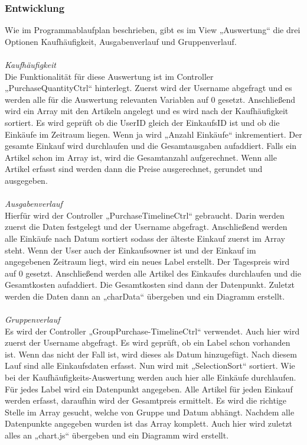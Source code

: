 \documentclass[12pt,a4paper]{article}
\begin{document}
\subsubsection*{Entwicklung}
Wie im Programmablaufplan beschrieben, gibt es im View „Auswertung“ die drei Optionen Kaufhäufigkeit, Ausgabenverlauf und Gruppenverlauf. 
\\
\\
\textit{Kaufhäufigkeit}
\\
Die Funktionalität für diese Auswertung ist im Controller „PurchaseQuantityCtrl“ hinterlegt. Zuerst wird der Username abgefragt und es werden alle für die Auswertung relevanten Variablen auf 0 gesetzt. Anschließend wird ein Array mit den Artikeln angelegt und es wird nach der Kaufhäufigkeit sortiert. Es wird geprüft ob die UserID gleich der EinkaufsID ist und ob die Einkäufe im Zeitraum liegen. Wenn ja wird „Anzahl Einkäufe“ inkrementiert. Der gesamte Einkauf wird durchlaufen und die Gesamtausgaben aufaddiert. Falls ein Artikel schon im Array ist, wird die Gesamtanzahl aufgerechnet. Wenn alle Artikel erfasst sind werden dann die Preise ausgerechnet, gerundet und ausgegeben.
\\
\\
\textit {Ausgabenverlauf}
\\
Hierfür wird der Controller „PurchaseTimelineCtrl“ gebraucht. Darin werden zuerst die Daten festgelegt und der Username abgefragt. Anschließend werden alle Einkäufe nach Datum sortiert sodass der älteste Einkauf zuerst im Array steht. Wenn der User auch der Einkaufsowner ist und der Einkauf im angegebenen Zeitraum liegt, wird ein neues Label erstellt. Der Tagespreis wird auf 0 gesetzt. Anschließend werden alle Artikel des Einkaufes durchlaufen und die Gesamtkosten aufaddiert. Die Gesamtkosten sind dann der Datenpunkt. Zuletzt werden die Daten dann an „charData“ übergeben und ein Diagramm erstellt.
\\
\\
\textit {Gruppenverlauf}
\\
Es wird der Controller „GroupPurchase-TimelineCtrl“ verwendet. Auch hier wird zuerst der Username abgefragt. Es wird geprüft, ob ein Label schon vorhanden ist. Wenn das nicht der Fall ist, wird dieses als Datum hinzugefügt. Nach diesem Lauf sind alle Einkaufsdaten erfasst. Nun wird mit „SelectionSort“ sortiert. Wie bei der Kaufhäufigkeits-Auswertung werden auch hier alle Einkäufe durchlaufen. Für jedes Label wird ein Datenpunkt angegeben. Alle Artikel für jeden Einkauf werden erfasst, daraufhin wird der Gesamtpreis ermittelt. Es wird die richtige Stelle im Array gesucht, welche von Gruppe und Datum abhängt. Nachdem alle Datenpunkte angegeben wurden ist das Array komplett. Auch hier wird zuletzt alles an „chart.js“ übergeben und ein Diagramm wird erstellt.
\end{document}
